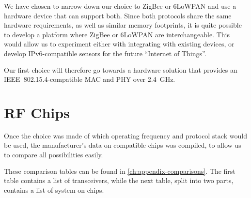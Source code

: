 \begin{table}[h]
    \myfloatalign
  \caption[Network stack summary]{Network stack summary}
  \label{tab:stack-comparison}
\end{table}


We have chosen to narrow down our choice to ZigBee or 6LoWPAN and use a hardware
device that can support both. Since both protocols share the same hardware
requirements, as well as similar memory footprints, it is quite possible to
develop a platform where ZigBee or 6LoWPAN are interchangeable. This would allow
us to experiment either with integrating with existing devices, or develop
IPv6-compatible sensors for the future ``Internet of Things''.

Our first choice will therefore go towards a hardware solution that provides an
IEEE~802.15.4-compatible MAC and PHY over \SI{2.4}{GHz}.

\section{RF Chips}\label{sec:chips}

Once the choice was made of which operating frequency and protocol stack would
be used, the manufacturer's data on compatible chips was compiled, to allow us
to compare all possibilities easily. 

These comparison tables can be found in \autoref{ch:appendix-comparisons}. The
first table contains a list of transceivers, while the next table, split into
two parts, contains a list of system-on-chips.

